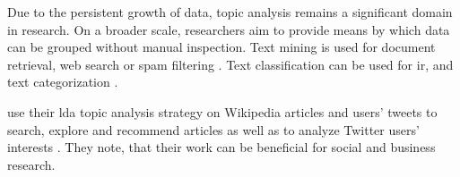 
Due to the persistent growth of data, topic analysis remains a significant domain in research.
On a broader scale, researchers aim to provide means by which data can be grouped without manual inspection.
Text mining is used for document retrieval, web search or spam filtering \cite{clusteringDocs2020}.
Text classification can be used for \ac{ir}, and text categorization \cite{tfidf2008}.

\citeauthor{text_mining2016} use their \ac{lda} topic analysis strategy on Wikipedia articles and users' tweets to search, explore and recommend articles 
as well as to analyze Twitter users' interests \cite{text_mining2016}.
They note, that their work can be beneficial for social and business research.